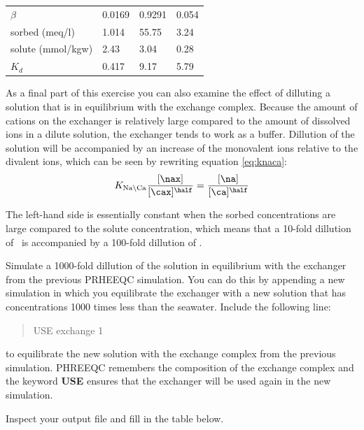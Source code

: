 \begin{table}[hb]
\centering
\footnotesize
\begin{tabular}{llll}
\toprule
 & \na	& \ca & \mg \\
\midrule
$\beta$           & 0.0169 & 0.9291 & 0.054 \\
sorbed (meq/l)    & 1.014  & 55.75  & 3.24 \\
solute (mmol/kgw) & 2.43   & 3.04   & 0.28 \\
$K_d$             & 0.417  & 9.17   & 5.79 \\
\bottomrule
\end{tabular}
\end{table}

As a final part of this exercise you can also examine the effect of dilluting a solution that is in equilibrium with the exchange complex. Because the amount of cations on the exchanger is relatively large compared to the amount of dissolved ions in a dilute solution, the exchanger tends to work as a buffer. Dillution of the solution will be accompanied by an increase of the monovalent ions relative to the divalent ions, which can be seen by rewriting equation \ref{eq:knaca}:
\begin{equation}
K_{\text{Na} \backslash \text{Ca}} \frac{[\nax]}{[\cax]^{\half}} = \frac{[\na]}{[\ca]^{\half}}
\end{equation}

The left-hand side is essentially constant when the sorbed concentrations are large compared to the solute concentration, which means that a 10-fold dillution of \na\ is accompanied by a 100-fold dillution of \ca.

Simulate a 1000-fold dillution of the solution in equilibrium with the exchanger from the previous PRHEEQC simulation. You can do this by appending a new simulation in which you equilibrate the exchanger with a new solution that has concentrations 1000 times less than the seawater. Include the following line:

\begin{quote}
USE exchange 1
\end{quote}

to equilibrate the new solution with the exchange complex from the previous simulation. PHREEQC remembers the composition of the exchange complex and the keyword \textbf{USE} ensures that the exchanger will be used again in the new simulation.

Inspect your output file and fill in the table below.

